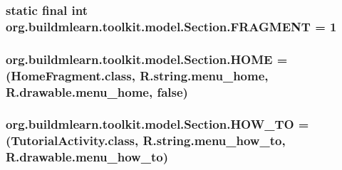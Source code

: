 \subsubsection[{\texorpdfstring{F\+R\+A\+G\+M\+E\+NT}{FRAGMENT}}]{\setlength{\rightskip}{0pt plus 5cm} static  final int org.\+buildmlearn.\+toolkit.\+model.\+Section.\+F\+R\+A\+G\+M\+E\+NT = 1\hspace{0.3cm}{\ttfamily [static]}}\hypertarget{enumorg_1_1buildmlearn_1_1toolkit_1_1model_1_1Section_a536f7f08eb441bb4af16270238999cc4}{}\label{enumorg_1_1buildmlearn_1_1toolkit_1_1model_1_1Section_a536f7f08eb441bb4af16270238999cc4}
\subsubsection[{\texorpdfstring{H\+O\+ME}{HOME}}]{\setlength{\rightskip}{0pt plus 5cm}org.\+buildmlearn.\+toolkit.\+model.\+Section.\+H\+O\+ME =(Home\+Fragment.\+class, R.\+string.\+menu\+\_\+home, R.\+drawable.\+menu\+\_\+home, false)}\hypertarget{enumorg_1_1buildmlearn_1_1toolkit_1_1model_1_1Section_aa21b990b779598b93484c13cc883b2e9}{}\label{enumorg_1_1buildmlearn_1_1toolkit_1_1model_1_1Section_aa21b990b779598b93484c13cc883b2e9}
\subsubsection[{\texorpdfstring{H\+O\+W\+\_\+\+TO}{HOW_TO}}]{\setlength{\rightskip}{0pt plus 5cm}org.\+buildmlearn.\+toolkit.\+model.\+Section.\+H\+O\+W\+\_\+\+TO =(Tutorial\+Activity.\+class, R.\+string.\+menu\+\_\+how\+\_\+to, R.\+drawable.\+menu\+\_\+how\+\_\+to)}\hypertarget{enumorg_1_1buildmlearn_1_1toolkit_1_1model_1_1Section_a339a902a73ccf5feded7345c716511a9}{}\label{enumorg_1_1buildmlearn_1_1toolkit_1_1model_1_1Section_a339a902a73ccf5feded7345c716511a9}
